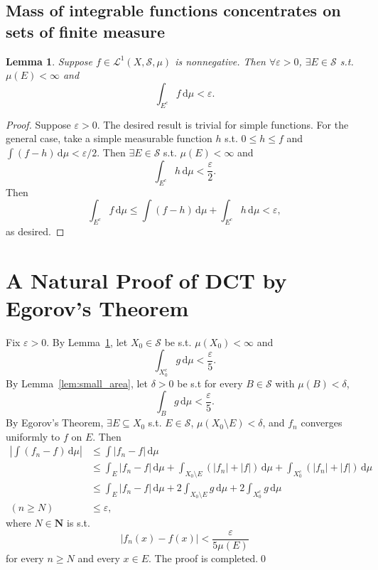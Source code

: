 \documentclass[11pt,a4paper]{article}
\theoremstyle{plain} %
\newtheorem{lemma}[thm]{Lemma}
\theoremstyle{definition}
\theoremstyle{remark}
\newcommand{\abs}[1]{\mathopen{}\left|#1\right|}
\newcommand{\N}{\mathbf{N}}
\renewcommand{\d}{\mathrm{d}}
\newcommand{\eps}{\varepsilon}
\renewcommand{\L}{\mathcal{L}}
\renewcommand{\S}{\mathcal{S}}
\begin{document}
\subsection{Mass of integrable functions concentrates on sets of finite measure}
\begin{lemma}\label{lem:mass_concentrate}
    Suppose $f\in\L^1(X,\S,\mu)$ is nonnegative. Then $\forall\eps>0$, $\exists E\in\S$ s.t. $\mu(E)<\infty$ and
    \[\int_{E^c}f\,\d\mu<\eps.\]
\end{lemma}
\begin{proof}
    Suppose $\eps>0$. The desired result is trivial for simple functions. For the general case, take a simple measurable function $h$ s.t. $0\le h\le f$ and $\int(f-h)\,\d\mu<\eps/2$. Then $\exists E\in\S$ s.t. $\mu(E)<\infty$ and
    \[\int_{E^c}h\,\d\mu<\frac\eps2.\]
    Then
    \[\int_{E^c}f\,\d\mu\le\int(f-h)\,\d\mu+\int_{E^c}h\,\d\mu<\eps,\]
    as desired.
\end{proof}

\section{A Natural Proof of DCT by Egorov's Theorem}
Fix $\eps>0$. By Lemma~\ref{lem:mass_concentrate}, let $X_0\in\S$ be s.t. $\mu(X_0)<\infty$ and
\[\int_{X_0^c}g\,\d\mu<\frac\eps5.\]
By Lemma~\ref{lem:small_area}, let $\delta>0$ be s.t for every $B\in\S$ with $\mu(B)<\delta$,
\[\int_Bg\,\d\mu<\frac\eps5.\]
By Egorov's Theorem, $\exists E\subseteq X_0$ s.t. $E\in\S$, $\mu(X_0\setminus E)<\delta$, and $f_n$ converges uniformly to $f$ on $E$. Then
\begin{align*}
    \abs{\int(f_n-f)\,\d\mu}&\le\int\abs{f_n-f}\,\d\mu \\
    &\le\int_E\abs{f_n-f}\,\d\mu + \int_{X_0\setminus E}(\abs{f_n}+\abs f)\,\d\mu + \int_{X_0^c}(\abs{f_n}+\abs f)\,\d\mu \\
    &\le\int_E\abs{f_n-f}\,\d\mu + 2\int_{X_0\setminus E}g\,\d\mu + 2\int_{X_0^c}g\,\d\mu \\
    (n\ge N)\quad&\le\eps,
\end{align*}
where $N\in\N$ is s.t.
\[\abs{f_n(x)-f(x)}<\frac\eps{5\mu(E)}\]
for every $n\ge N$ and every $x\in E$. The proof is completed.\qed
\end{document}
